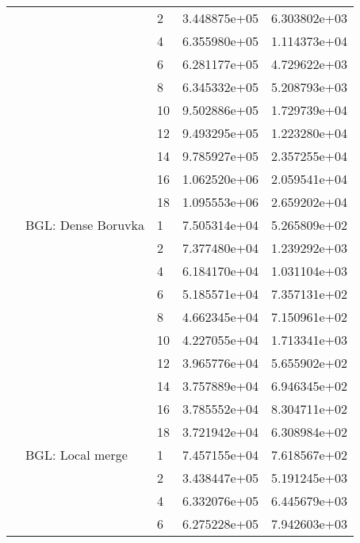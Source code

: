 \begin{tabular}{lllrr}
                      &            & 2  &  3.448875e+05 &  6.303802e+03 \\
                      &            & 4  &  6.355980e+05 &  1.114373e+04 \\
                      &            & 6  &  6.281177e+05 &  4.729622e+03 \\
                      &            & 8  &  6.345332e+05 &  5.208793e+03 \\
                      &            & 10 &  9.502886e+05 &  1.729739e+04 \\
                      &            & 12 &  9.493295e+05 &  1.223280e+04 \\
                      &            & 14 &  9.785927e+05 &  2.357255e+04 \\
                      &            & 16 &  1.062520e+06 &  2.059541e+04 \\
                      &            & 18 &  1.095553e+06 &  2.659202e+04 \\
                      & BGL: Dense Boruvka & 1  &  7.505314e+04 &  5.265809e+02 \\
                      &            & 2  &  7.377480e+04 &  1.239292e+03 \\
                      &            & 4  &  6.184170e+04 &  1.031104e+03 \\
                      &            & 6  &  5.185571e+04 &  7.357131e+02 \\
                      &            & 8  &  4.662345e+04 &  7.150961e+02 \\
                      &            & 10 &  4.227055e+04 &  1.713341e+03 \\
                      &            & 12 &  3.965776e+04 &  5.655902e+02 \\
                      &            & 14 &  3.757889e+04 &  6.946345e+02 \\
                      &            & 16 &  3.785552e+04 &  8.304711e+02 \\
                      &            & 18 &  3.721942e+04 &  6.308984e+02 \\
                      & BGL: Local merge & 1  &  7.457155e+04 &  7.618567e+02 \\
                      &            & 2  &  3.438447e+05 &  5.191245e+03 \\
                      &            & 4  &  6.332076e+05 &  6.445679e+03 \\
                      &            & 6  &  6.275228e+05 &  7.942603e+03 \\

\end{tabular}
